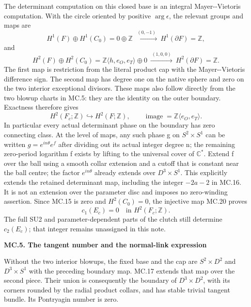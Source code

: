 The determinant computation on this closed base is an
integral Mayer-\/-Vietoris computation. With the circle
oriented by positive \(\arg\epsilon\), the relevant
groups and maps are
\[
 H^1(F)\oplus H^1(C_0)=0\oplus\mathbb Z
  \ \xrightarrow{\ (0,-1)\ }\ H^1(\partial F)=\mathbb Z,
                                                        \tag{MC.18}
\]
and
\[
 H^2(F)\oplus H^2(C_0)=
 \mathbb Z\langle h,e_O,e_T\rangle\oplus0
 \ \xrightarrow{\ (1,0,0)\ }\
 H^2(\partial F)=\mathbb Z.                             \tag{MC.19}
\]
The first map is restriction from the literal product
cap with the Mayer-\/-Vietoris difference sign. The second
map has degree one on the native sphere and zero on
the two interior exceptional divisors. These maps also
follow directly from the two blowup charts in MC.5:
they are the identity on the outer boundary. Exactness
therefore gives
\[
 H^2(F_c;\mathbb Z)\hookrightarrow H^2(F;\mathbb Z),
 \qquad\operatorname{image}=\mathbb Z\langle e_O,e_T\rangle.
                                                        \tag{MC.20}
\]
In particular every actual determinant phase on the
boundary has zero connecting class. At the level of
maps, any such phase g on \(S^2\times S^1\) can be
written \(g=e^{in\theta}e^f\) after dividing out its
actual integer degree n; the remaining zero-period
logarithm f exists by lifting to the universal cover
of \(\mathbb C^*\). Extend f over the ball using a
smooth collar extension and a cutoff that is constant
near the ball centre; the factor \(e^{in\theta}\)
already extends over \(D^3\times S^1\). This explicitly
extends the retained determinant map, including the
integer \(-2a-2\) in MC.16. It is not an extension over
the parameter disc and imposes no zero-winding assertion.
Since MC.15 is zero and \(H^2(C_0)=0\), the injective
map MC.20 proves
\[
 c_1(E_c)=0\quad\text{in }H^2(F_c;\mathbb Z).            \tag{MC.21}
\]
The full SU2 and parameter-dependent parts of the
clutch still determine \(c_2(E_c)\); that integer
remains unassigned in this note.

\par

\medskip\noindent\textbf{MC.5. The tangent number and the normal-link expression}

\par\nobreak

Without the two interior blowups, the fixed base and
the cap are \(S^2\times D^2\) and \(D^3\times S^1\)
with the preceding boundary map. MC.17 extends that
map over the second piece. Their union is consequently
the boundary of \(D^3\times D^2\), with its corners
rounded by the radial product collars, and has stable
trivial tangent bundle. Its Pontryagin number is zero.

